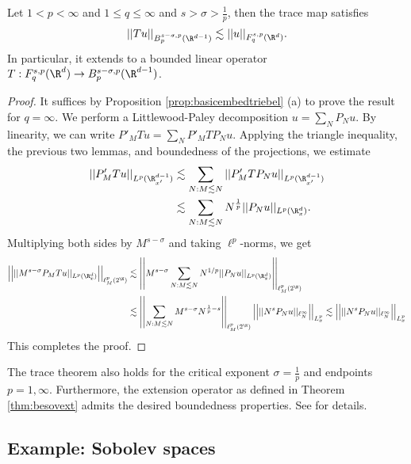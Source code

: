 \begin{theorem}
	Let $1 < p < \infty$ and $1 \leq q \leq \infty$ and $s > \sigma > \tfrac1p$, then the trace map satisfies
		\[ ||Tu||_{B^{s - \sigma, p}_p (\R^{d - 1})} \lesssim ||u||_{F^{s, p}_q (\R^d)}. \]
	In particular, it extends to a bounded linear operator $T: 	F^{s, p}_q (\R^d) \to B^{s - \sigma, p}_p (\R^{d - 1})$.
\end{theorem}

\begin{proof}
	It suffices by Proposition \ref{prop:basicembedtriebel} (a) to prove the result for $q = \infty$. We perform a Littlewood-Paley decomposition $u = \sum_N P_N u$. By linearity, we can write $P'_M T u = \sum_N P'_M T P_N u$. Applying the triangle inequality, the previous two lemmas, and boundedness of the projections, we estimate
		\begin{align*}
			||P'_M Tu||_{L^p (\R^{d-1}_{x'})}
				&\lesssim  \sum_{N : M \lesssim N} ||P'_M T P_N u||_{L^p (\R^{d - 1}_{x'})}\\
				&\lesssim \sum_{N : M \lesssim N} N^{\frac1p} ||P_N u||_{L^p (\R^d_x)}.
		\end{align*}		
	Multiplying both sides by $M^{s- \sigma}$ and taking $\ell^p$-norms, we get
		\begin{align*}
			\Big|\Big|  ||M^{s - \sigma} P_M T u||_{L^p (\R^d_x)}\Big|\Big|_{\ell^p_M (2^\N)}
			 	&\lesssim \left|\left| M^{s - \sigma} \sum_{N : M \lesssim N} N^{1/p} ||P_N u||_{L^p (\R^d_x)}\right|\right|_{\ell^p_M (2^\N)} \\
			 	&\lesssim \left|\left| \sum_{N : M \lesssim N} M^{s - \sigma} N^{\frac1p -s} \right|\right|_{\ell^p_M (2^\N)} \Big|\Big|  || N^s P_N u ||_{\ell^\infty_N} \Big|\Big|_{L^p_x} \lesssim \Big|\Big| ||N^{s} P_N u||_{\ell^\infty_N} \Big|\Big|_{L^p_x}
		\end{align*}	 
	This completes the proof. 
\end{proof}

\begin{remark}
	The trace theorem also holds for the critical exponent $\sigma = \frac1p$ and endpoints $p = 1, \infty$. Furthermore, the extension operator as defined in Theorem \ref{thm:besovext} admits the desired boundedness properties. See \cite[Theorem 2.7.2]{Triebel1983} for details. 
\end{remark}

\subsection{Example: Sobolev spaces}

